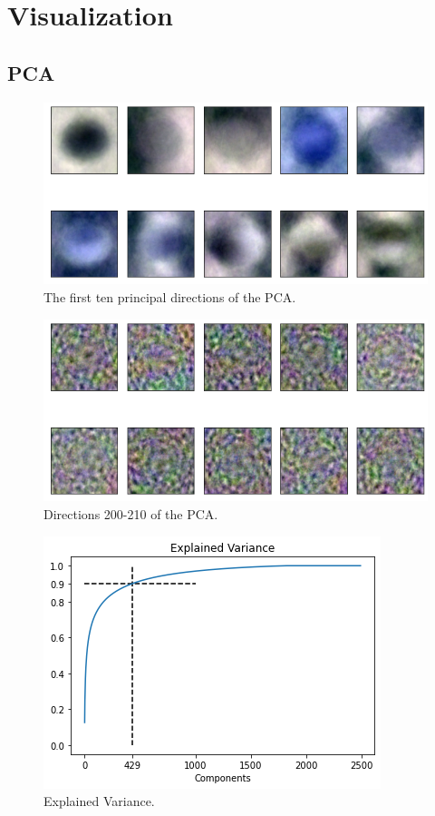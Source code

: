 \documentclass[aps,twocolumn,secnumarabic,nobalancelastpage,amsmath,amssymb,
nofootinbib]{revtex4}
\begin{document}
\section{Visualization}\label{visualization}

\subsection*{PCA}\label{pca}

\begin{figure}[h]
	\centering
	\includegraphics[width=0.7\linewidth]{Images/PCA1}
	\caption{The first ten principal directions of the PCA.}
	\label{fig:pca1}
\end{figure}
\begin{figure}[h]
	\centering
	\includegraphics[width=0.7\linewidth]{Images/PCA200}
	\caption{Directions 200-210 of the PCA.}
	\label{fig:pca200}
\end{figure}

\begin{figure}[h!]
	\centering
	\includegraphics[width=0.7\linewidth]{Images/ExplainedVariance90}
	\caption{Explained Variance.}
	\label{fig:explainedvariance90}
\end{figure}
\end{document}
